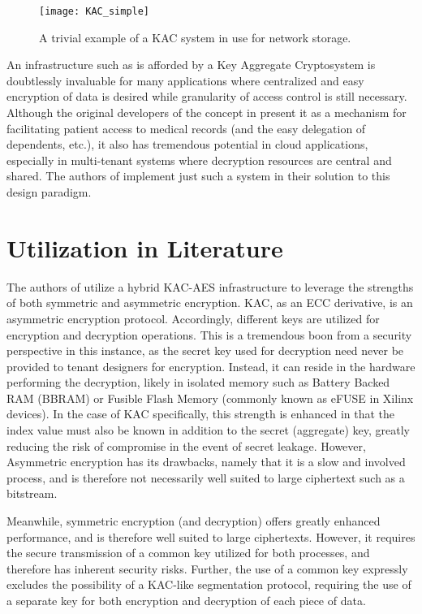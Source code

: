 \begin{figure}[h]
    \centering
    \texttt{[image: KAC\_simple]}
    \caption[KAC Example]{A trivial example of a KAC system in use for network storage. \cite{chu_key-aggregate_2014}}
    \label{fig:KAC_simple}
\end{figure}

An infrastructure such as is afforded by a Key Aggregate Cryptosystem is doubtlessly invaluable for many applications where centralized and easy encryption of data is desired while granularity of access control is still necessary. Although the original developers of the concept in \cite{chu_key-aggregate_2014} present it as a mechanism for facilitating patient access to medical records (and the easy delegation of dependents, etc.), it also has tremendous potential in cloud applications, especially in multi-tenant systems where decryption resources are central and shared. The authors of \cite{bag_cryptographically_2020} implement just such a system in their solution to this design paradigm.

\section{Utilization in Literature}\label{sec:KACLiterature}
The authors of \cite{bag_cryptographically_2020} utilize a hybrid KAC-AES infrastructure to leverage the strengths of both symmetric and asymmetric encryption. KAC, as an ECC derivative, is an asymmetric encryption protocol. Accordingly, different keys are utilized for encryption and decryption operations. This is a tremendous boon from a security perspective in this instance, as the secret key used for decryption need never be provided to tenant designers for encryption. Instead, it can reside in the hardware performing the decryption, likely in isolated memory such as Battery Backed RAM (BBRAM) or Fusible Flash Memory (commonly known as eFUSE in Xilinx devices). In the case of KAC specifically, this strength is enhanced in that the index value must also be known in addition to the secret (aggregate) key, greatly reducing the risk of compromise in the event of secret leakage. However, Asymmetric encryption has its drawbacks, namely that it is a slow and involved process, and is therefore not necessarily well suited to large ciphertext such as a bitstream.

Meanwhile, symmetric encryption (and decryption) offers greatly enhanced performance, and is therefore well suited to large ciphertexts. However, it requires the secure transmission of a common key utilized for both processes, and therefore has inherent security risks. Further, the use of a common key expressly excludes the possibility of a KAC-like segmentation protocol, requiring the use of a separate key for both encryption and decryption of each piece of data.

